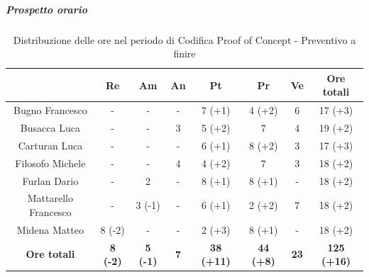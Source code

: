 \subparagraph{Prospetto orario} \label{subparagraph:prospetto_orario_PoC}
\begin{table}[H]
  \centering
  \renewcommand{\arraystretch}{1.8}
  \begin{tabular}{c|c|c|c|c|c|c|c}
    \rowcolor[HTML]{125E28}
    \multicolumn{1}{c}{\color[HTML]{FFFFFF}\textbf{ Nominativo }}
                         & \multicolumn{1}{c}{\color[HTML]{FFFFFF}\textbf{ Re }}
                         & \multicolumn{1}{c}{\color[HTML]{FFFFFF}\textbf{ Am}}
                         & \multicolumn{1}{c}{\color[HTML]{FFFFFF}\textbf{ An }}
                         & \multicolumn{1}{c}{\color[HTML]{FFFFFF}\textbf{ Pt }}
                         & \multicolumn{1}{c}{\color[HTML]{FFFFFF}\textbf{ Pr }}
                         & \multicolumn{1}{c}{\color[HTML]{FFFFFF}\textbf{ Ve }}
                         & \multicolumn{1}{c}{\color[HTML]{FFFFFF}\textbf{ Ore totali }}                                                                                                          \\
    \hline
    Bugno Francesco      & -                                                             & -               & -          & 7 (+1)            & 4 (+2)           & 6           & 17 (+3)            \\
    Busacca Luca         & -                                                             & -               & 3          & 5 (+2)            & 7                & 4           & 19 (+2)            \\
    Carturan Luca        & -                                                             & -               & -          & 6 (+1)            & 8 (+2)           & 3           & 17 (+3)            \\
    Filosofo Michele     & -                                                             & -               & 4          & 4 (+2)            & 7                & 3           & 18 (+2)            \\
    Furlan Dario         & -                                                             & 2               & -          & 8 (+1)            & 8 (+1)           & -           & 18 (+2)            \\
    Mattarello Francesco & -                                                             & 3 (-1)          & -          & 6 (+1)            & 2 (+2)           & 7           & 18 (+2)            \\
    Midena Matteo        & 8 (-2)                                                        & -               & -          & 2 (+3)            & 8 (+1)           & -           & 18 (+2)            \\
    \textbf{Ore totali}  & \textbf{8 (-2)}                                               & \textbf{5 (-1)} & \textbf{7} & \textbf{38 (+11)} & \textbf{44 (+8)} & \textbf{23} & \textbf{125 (+16)}
  \end{tabular}
  \caption{Distribuzione delle ore nel periodo di Codifica Proof of Concept - Preventivo a finire}
\end{table}

